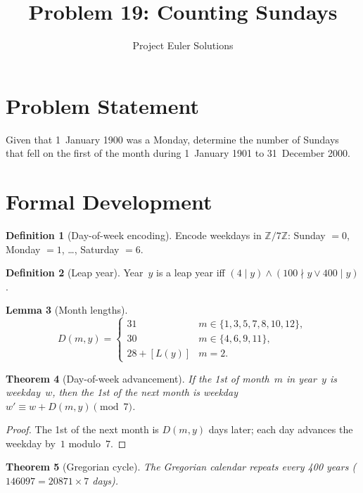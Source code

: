 \documentclass[12pt,a4paper]{article}
\title{Problem 19: Counting Sundays}
\author{Project Euler Solutions}
\date{}
\newtheorem{theorem}{Theorem}
\newtheorem{lemma}[theorem]{Lemma}
\theoremstyle{definition}
\newtheorem{definition}[theorem]{Definition}
\begin{document}
\maketitle

\section{Problem Statement}
Given that 1~January 1900 was a Monday, determine the number of Sundays that fell on the
first of the month during 1~January 1901 to 31~December 2000.

\section{Formal Development}

\begin{definition}[Day-of-week encoding]
Encode weekdays in $\mathbb{Z}/7\mathbb{Z}$: Sunday $= 0$, Monday $= 1$, \ldots, Saturday $= 6$.
\end{definition}

\begin{definition}[Leap year]
Year~$y$ is a leap year iff $(4 \mid y) \wedge (100 \nmid y \lor 400 \mid y)$.
\end{definition}

\begin{lemma}[Month lengths]
\[
D(m, y) = \begin{cases}
31 & m \in \{1,3,5,7,8,10,12\}, \\
30 & m \in \{4,6,9,11\}, \\
28 + [L(y)] & m = 2.
\end{cases}
\]
\end{lemma}

\begin{theorem}[Day-of-week advancement]
\label{thm:advance}
If the 1st of month~$m$ in year~$y$ is weekday~$w$, then the 1st of the next month is
weekday $w' \equiv w + D(m,y) \pmod{7}$.
\end{theorem}

\begin{proof}
The 1st of the next month is $D(m,y)$ days later; each day advances the weekday by~$1$
modulo~$7$.
\end{proof}

\begin{theorem}[Gregorian cycle]
The Gregorian calendar repeats every 400 years ($146097 = 20871 \times 7$ days).
\end{theorem}
\end{document}
